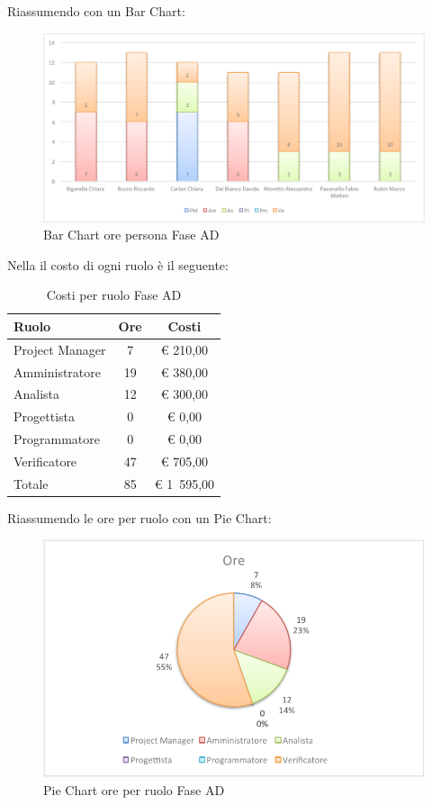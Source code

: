 				Riassumendo con un Bar Chart:
				\begin{figure}[H]\centering
					\includegraphics[width=\textwidth]{PianoDiProgetto/Pics/ChartOreFaseAD.pdf}
					\caption{Bar Chart ore persona Fase AD}
				\end{figure}
				Nella  il costo di ogni ruolo è il seguente:
				\begin{table}[H]
					\begin{center}
						\begin{tabular}{| l | c | c |}
							\hline
							Ruolo 			& Ore 	& Costi  \\ \hline
							
							Project Manager	& 7 		& \euro{} 210,00 	\\
							Amministratore 		& 19 		& \euro{} 380,00 	\\
							Analista	 		& 12 		& \euro{} 300,00 	\\
							Progettista 		& 0		& \euro{} 0,00 	\\
							Programmatore		& 0		& \euro{} 0,00	\\
							Verificatore		& 47 		& \euro{} 705,00 	\\ \hline \hline
							
							Totale	 		& 85 		& \euro{} 1~595,00 	\\ \hline
						\end{tabular}
					\end{center}
					\caption{Costi per ruolo Fase AD}
				\end{table}
				Riassumendo le ore per ruolo con un Pie Chart:
				\begin{figure}[H]\centering
					\includegraphics[width=\textwidth]{PianoDiProgetto/Pics/ChartTotOreFaseAD.pdf}
					\caption{Pie Chart ore per ruolo Fase AD}
				\end{figure}
